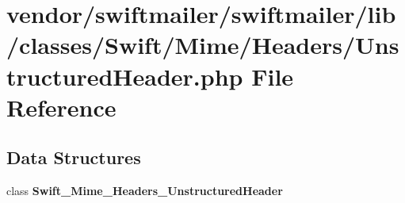 \section{vendor/swiftmailer/swiftmailer/lib/classes/\+Swift/\+Mime/\+Headers/\+Unstructured\+Header.php File Reference}
\label{_unstructured_header_8php}
\subsection*{Data Structures}
\begin{DoxyCompactItemize}
\item 
class {\bf Swift\+\_\+\+Mime\+\_\+\+Headers\+\_\+\+Unstructured\+Header}
\end{DoxyCompactItemize}
